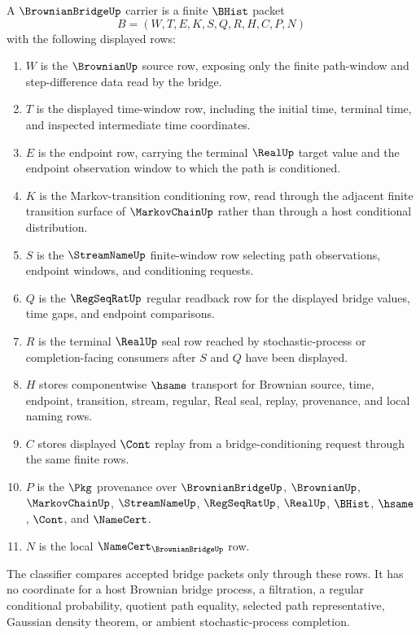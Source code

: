 \begin{definition}
\label{def:brownian-bridge-carrier}
A $\BrownianBridgeUp$ carrier is a finite $\BHist$ packet
$$
B=(W,T,E,K,S,Q,R,H,C,P,N)
$$
with the following displayed rows:
\begin{enumerate}
\item $W$ is the $\BrownianUp$ source row, exposing only the finite path-window and step-difference data read by the bridge.
\item $T$ is the displayed time-window row, including the initial time, terminal time, and inspected intermediate time coordinates.
\item $E$ is the endpoint row, carrying the terminal $\RealUp$ target value and the endpoint observation window to which the path is conditioned.
\item $K$ is the Markov-transition conditioning row, read through the adjacent finite transition surface of $\MarkovChainUp$ rather than through a host conditional distribution.
\item $S$ is the $\StreamNameUp$ finite-window row selecting path observations, endpoint windows, and conditioning requests.
\item $Q$ is the $\RegSeqRatUp$ regular readback row for the displayed bridge values, time gaps, and endpoint comparisons.
\item $R$ is the terminal $\RealUp$ seal row reached by stochastic-process or completion-facing consumers after $S$ and $Q$ have been displayed.
\item $H$ stores componentwise $\hsame$ transport for Brownian source, time, endpoint, transition, stream, regular, Real seal, replay, provenance, and local naming rows.
\item $C$ stores displayed $\Cont$ replay from a bridge-conditioning request through the same finite rows.
\item $P$ is the $\Pkg$ provenance over $\BrownianBridgeUp$, $\BrownianUp$, $\MarkovChainUp$, $\StreamNameUp$, $\RegSeqRatUp$, $\RealUp$, $\BHist$, $\hsame$, $\Cont$, and $\NameCert$.
\item $N$ is the local $\NameCert_{\BrownianBridgeUp}$ row.
\end{enumerate}
The classifier compares accepted bridge packets only through these rows. It has no coordinate for a host Brownian bridge process, a filtration, a regular conditional probability, quotient path equality, selected path representative, Gaussian density theorem, or ambient stochastic-process completion.
\end{definition}

